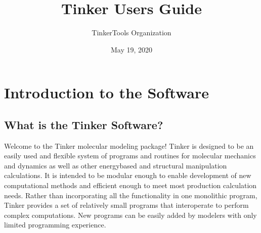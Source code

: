 \documentclass[letterpaper,11pt,english]{sphinxmanual}
\title{Tinker User\textquotesingle{}s Guide}
\date{May 19, 2020}
\author{TinkerTools Organization}
\begin{document}
\pagestyle{empty}
\sphinxmaketitle
\pagestyle{plain}
\sphinxtableofcontents
\pagestyle{normal}
\label{\detokenize{index::doc}}



\chapter{Introduction to the Software}
\label{\detokenize{text/introduction:introduction-to-the-software}}\label{\detokenize{text/introduction::doc}}

\section{What is the Tinker Software?}
\label{\detokenize{text/introduction:what-is-the-tinker-software}}
Welcome to the Tinker molecular modeling package! Tinker is designed to be an easily used and flexible system of programs and routines for molecular mechanics and dynamics as well as other energy\sphinxhyphen{}based and structural manipulation calculations. It is intended to be modular enough to enable development of new computational methods and efficient enough to meet most production calculation needs. Rather than incorporating all the functionality in one monolithic program, Tinker provides a set of relatively small programs that interoperate to perform complex computations. New programs can be easily added by modelers with only limited programming experience.
\end{document}
